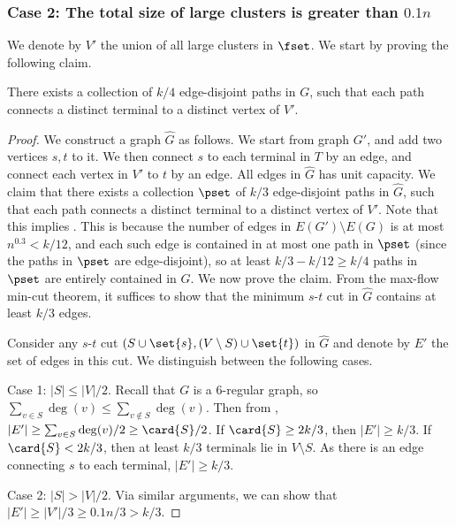 
\subsubsection*{Case 2: The total size of large clusters is greater than $0.1n$}

We denote by $V'$ the union of all large clusters in $\fset$.
We start by proving the following claim.

\begin{claim} \label{clm:paths}
There exists a collection of $k/4$ edge-disjoint paths in $G$, such that each path connects a distinct terminal to a distinct vertex of $V'$.
\end{claim}

\begin{proof}
We construct a graph $\hat G$ as follows. We start from graph $G'$, and add two vertices $s,t$ to it. We then connect $s$ to each terminal in $T$ by an edge, and connect each vertex in $V'$ to $t$ by an edge. All edges in $\hat G$ has unit capacity. We claim that there exists a collection $\pset$ of $k/3$ edge-disjoint paths in $\hat G$, such that each path connects a distinct terminal to a distinct vertex of $V'$. Note that this implies . This is because the number of edges in $E(G')\setminus E(G)$ is at most $n^{0.3}<k/12$, and each such edge is contained in at most one path in $\pset$ (since the paths in $\pset$ are edge-disjoint), so at least $k/3-k/12\ge k/4$ paths in $\pset$ are entirely contained in $G$.
We now prove the claim.
From the max-flow min-cut theorem, it suffices to show that the minimum $s$-$t$ cut in $\hat G$ contains at least $k/3$ edges.


Consider any $s$-$t$ cut $(S \cup \set{s},(V \setminus S) \cup \set{t})$ in $\hat G$ and denote by $E'$ the set of edges in this cut. We distinguish between the following cases.

Case 1: $|S|\le |V|/2$. Recall that $G$ is a $6$-regular graph, so $\sum_{v\in S}\deg(v)\le \sum_{v\notin S}\deg(v)$.
Then from , $|E'|\ge \sum_{v\in S}\deg(v)/2\ge \card{S}/2$. If $\card{S} \ge 2k/3$, then $|E'|\ge k/3$. If $\card{S} < 2k/3$, then at least $k/3$ terminals lie in $V\setminus S$. As there is an edge connecting $s$ to each terminal, $|E'|\ge k/3$. 

Case 2: $|S|> |V|/2$.
Via similar arguments, we can show that $|E'|\ge |V'|/3\ge 0.1n/3> k/3$.
\end{proof}

